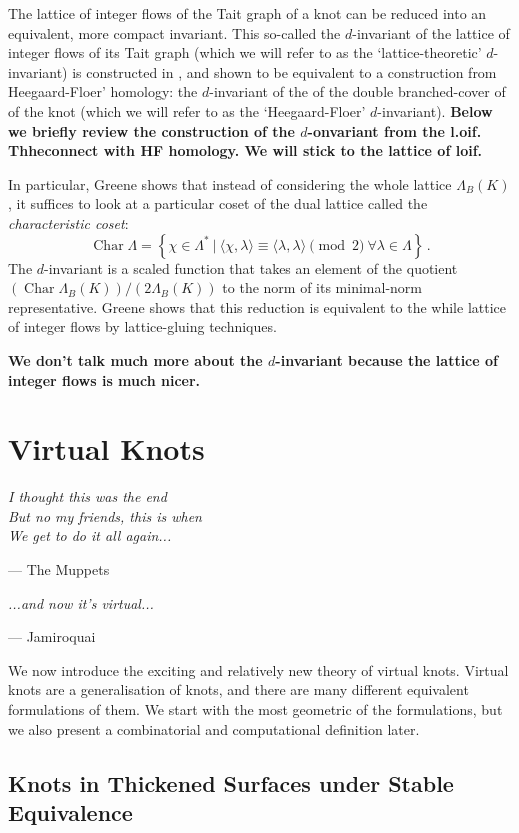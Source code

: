\documentclass[12pt]{report}
\newcommand{\notered}[1]{{\color{Red} \textbf{#1}}}
\begin{document}
The lattice of integer flows of the Tait graph of a knot can be reduced into an equivalent, more compact invariant. This so-called the $d$-invariant of the lattice of integer flows of its Tait graph (which we will refer to as the `lattice-theoretic' $d$-invariant) is constructed in \cite{lattices-graphs-mutation}, and shown to be equivalent to a construction from Heegaard-Floer' homology: the $d$-invariant of the of the double branched-cover of of the knot (which we will refer to as the `Heegaard-Floer' $d$-invariant). 
\notered{Below we briefly review the construction of the $d$-onvariant from the l.oif. Thheconnect with HF homology. We will stick to the lattice of loif.}

In particular, Greene shows that instead of considering the whole lattice $\Lambda_{B}(K)$, it suffices to look at a particular coset of the dual lattice called the \textit{characteristic coset}:
\[\operatorname{Char} \Lambda = \left\{ \chi \in \Lambda^{*} \ \Big|\  \langle\chi,\lambda\rangle \equiv \langle\lambda,\lambda\rangle \pmod 2\  \forall \lambda \in \Lambda \right\}\,.\]
The $d$-invariant is a scaled function that takes an element of the quotient $(\operatorname{Char} \Lambda_{B}(K)) / (2 \Lambda_{B}(K))$ to the norm of its minimal-norm representative. Greene shows that this reduction is equivalent to the while lattice of integer flows by lattice-gluing techniques.

\notered{We don't talk much more about the $d$-invariant because the lattice of integer flows is much nicer.}

\chapter{Virtual Knots}

\epigraph{\itshape I thought this was the end\\But no my friends, this is when\\We get to do it all again...}{--- The Muppets}
\epigraph{\itshape ...and now it's virtual...}{--- Jamiroquai}


We now introduce the exciting and relatively new theory of virtual knots. Virtual knots are a generalisation of knots, and there are many different equivalent formulations of them. We start with the most geometric of the formulations, but we also present a combinatorial and computational definition later.


\section{Knots in Thickened Surfaces under Stable Equivalence}
\end{document}
